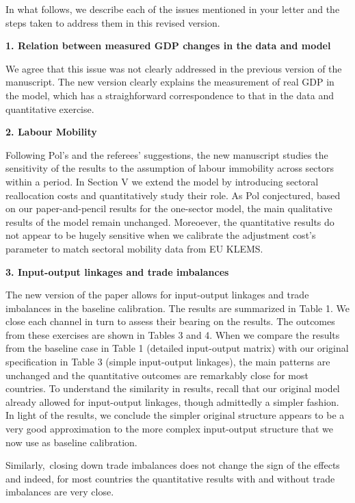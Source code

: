 \documentclass[12pt]{article}
\begin{document}
In what follows, we describe each of the issues mentioned in your letter and
the steps taken to address them in this revised version.\bigskip

\textbf{1. Relation between measured GDP changes in the data and model}

We agree that this issue was not clearly addressed in the previous version
of the manuscript. The new version clearly explains the measurement of real
GDP in the model, which has a straighforward correspondence to that in the
data and quantitative exercise.


\bigskip

\textbf{2. Labour Mobility}

Following Pol's and the referees' suggestions, the new manuscript studies
the sensitivity of the results to the assumption of labour immobility across
sectors within a period. In Section V we extend the model by introducing
sectoral reallocation costs and quantitatively study their role. As Pol
conjectured, based on our paper-and-pencil results for the one-sector model,
the main qualitative results of the model remain unchanged. Moreoever, the
quantitative results do not appear to be hugely sensitive when we calibrate
the adjustment cost's parameter to match sectoral mobility data from EU
KLEMS.

\bigskip

\textbf{3. Input-output linkages and trade imbalances}

The new version of the paper allows for input-output linkages and trade
imbalances in the baseline calibration. The results are summarized in Table
1. We close each channel in turn to assess their bearing on the results. The
outcomes from these exercises are shown in Tables 3 and 4. When we compare
the results from the baseline case in Table 1 (detailed input-output matrix)
with our original specification in Table 3 (simple input-output linkages),
the main patterns are unchanged and the quantitative outcomes are remarkably
close for most countries. To understand the similarity in results, recall
that our original model already allowed for input-output linkages, though
admittedly a simpler fashion. In light of the results, we conclude the
simpler original structure appears to be a very good approximation to the
more complex input-output structure that we now use as baseline calibration.

Similarly,\ closing down trade imbalances does not change the sign of the
effects and indeed, for most countries the quantitative results with and
without trade imbalances are very close.\bigskip
\end{document}
